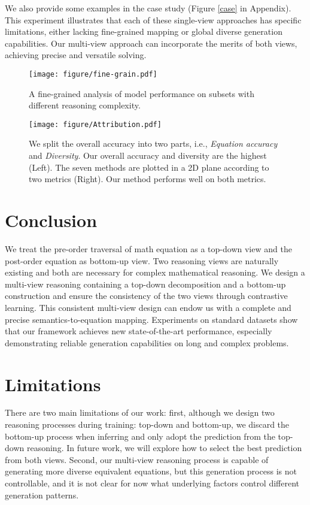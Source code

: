 \documentclass[11pt]{article}
\begin{document}
\indent We also provide some examples in the case study (Figure \ref{case} in Appendix). This experiment illustrates that each of these single-view approaches has specific limitations, either lacking fine-grained mapping or global diverse generation capabilities. Our multi-view approach can incorporate the merits of both views, achieving precise and versatile solving. 
\begin{figure}[t] \centering \texttt{[image: figure/fine-grain.pdf]} \caption{A fine-grained analysis of model performance on subsets with different reasoning complexity.} \label{Fig.fine-grain} \end{figure}
\begin{figure}[t] \centering \texttt{[image: figure/Attribution.pdf]} \caption{We split the overall accuracy into two parts, i.e., \emph{Equation accuracy} and \emph{Diversity}. Our overall accuracy and diversity are the highest (Left). The seven methods are plotted in a 2D plane according to two metrics (Right). Our method performs well on both metrics.} \label{Fig.Attribution} \end{figure}
\section{Conclusion}
We treat the pre-order traversal of math equation as a top-down view and the post-order equation as bottom-up view. Two reasoning views are naturally existing and both are necessary for complex mathematical reasoning. We design a multi-view reasoning containing a top-down decomposition and a bottom-up construction and ensure the consistency of the two views through contrastive learning. This consistent multi-view 
design can endow us with a complete and precise semantics-to-equation mapping. Experiments on standard datasets show that our framework achieves new state-of-the-art performance, especially demonstrating reliable generation capabilities on long and complex problems. 

\section*{Limitations}
There are two main limitations of our work: first, although we design two reasoning processes during training: top-down and bottom-up, we discard the bottom-up process when inferring and only adopt the prediction from the top-down reasoning. In future work, we will explore how to select the best prediction from both views. Second, our multi-view reasoning process is capable of generating more diverse equivalent equations, but this generation process is not controllable, and it is not clear for now what underlying factors control different generation patterns.
\end{document}
